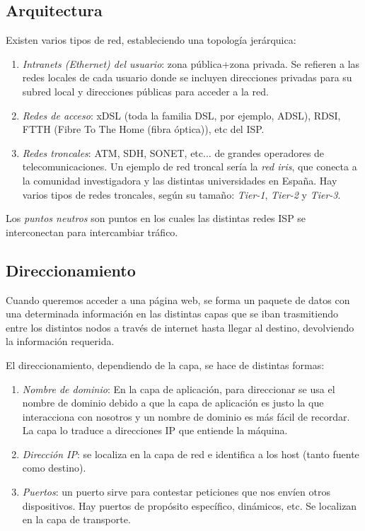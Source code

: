 \documentclass[10pt,a4paper,spanish]{report}
\begin{document}
\subsection{\textcolor{tema1}Arquitectura}
Existen varios tipos de red, estableciendo una topología jerárquica:

\begin{enumerate}
  \item \textit{\textcolor{tema1}{Intranets (Ethernet) del usuario}}: zona pública+zona privada. Se refieren a las redes locales de cada usuario donde se incluyen direcciones privadas para su subred local y direcciones públicas para acceder a la red.
  \item \textit{\textcolor{tema1}{Redes de acceso}}: xDSL (toda la familia DSL, por ejemplo, ADSL), RDSI, FTTH (Fibre To The Home (fibra óptica)), etc del ISP.
  \item \textit{\textcolor{tema1}{Redes troncales}}: ATM, SDH, SONET, etc$\ldots$ de grandes operadores de telecomunicaciones. Un ejemplo de red troncal sería la \textit{\textcolor{tema1}{red iris}}, que conecta a la comunidad investigadora y las distintas universidades en España. Hay varios tipos de redes troncales, según su tamaño: \textit{\textcolor{tema1}{Tier-1}}, \textit{\textcolor{tema1}{Tier-2}} y \textit{\textcolor{tema1}{Tier-3}}.
\end{enumerate}

Los \textit{\textcolor{tema1}{puntos neutros}} son puntos en los cuales las distintas redes ISP se interconectan para intercambiar tráfico.

\subsection{\textcolor{tema1}Direccionamiento}
Cuando queremos acceder a una página web, se forma un paquete de datos con una determinada información en las distintas capas que se iban trasmitiendo entre los distintos nodos a través de internet hasta llegar al destino, devolviendo la información requerida.

El direccionamiento, dependiendo de la capa, se hace de distintas formas:
\begin{enumerate}[\color{tema1}{$\heartsuit$}]
  \item \textit{\textcolor{tema1}{Nombre de dominio}}: En la capa de aplicación, para direccionar se usa el nombre de dominio debido a que la capa de aplicación es justo la que interacciona con nosotros y un nombre de dominio es más fácil de recordar. La capa lo traduce a direcciones IP que entiende la máquina.

  \item \textit{\textcolor{tema1}{Dirección IP}}: se localiza en la capa de red e identifica a los host (tanto fuente como destino).

  \item \textit{\textcolor{tema1}{Puertos}}: un puerto sirve para contestar peticiones que nos envíen otros dispositivos. Hay puertos de propósito específico, dinámicos, etc. Se localizan en la capa de transporte.
\end{enumerate}
\end{document}
